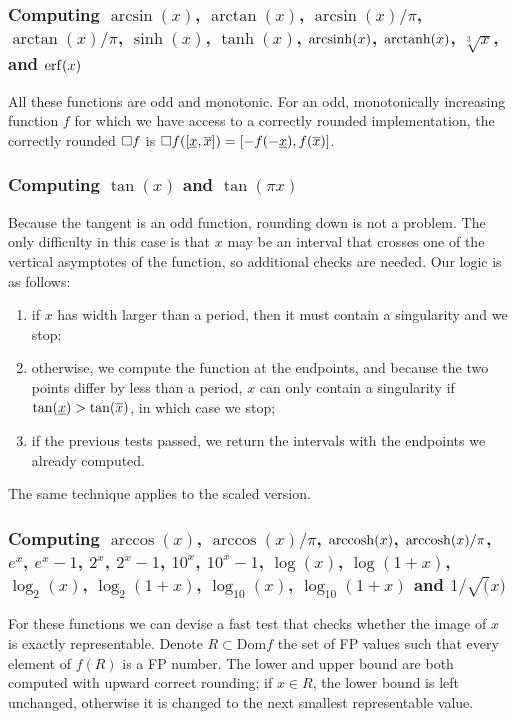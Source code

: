 \subsubsection{Computing $\arcsin(x)$, $\arctan(x)$, $\arcsin(x)/\pi$, $\arctan(x)/\pi$, $\sinh(x)$, $\tanh(x)$, $\operatorname{arcsinh}(x)$, $\operatorname{arctanh}(x)$, $\sqrt[3]{x}$, and $\operatorname{erf}(x)$}
All these functions are odd and monotonic.
For an odd, monotonically increasing function $f$ for which we have access to a correctly rounded implementation, the correctly rounded $\Box f$ is $\Box f([\underline{x}, \overline{x}]) = [-f(-\underline{x}), f(\overline{x})]$.

\subsubsection{Computing $\tan(x)$ and $\tan(\pi x)$}
Because the tangent is an odd function, rounding down is not a problem.
The only difficulty in this case is that $x$ may be an interval that crosses one of the vertical asymptotes of the function, so additional checks are needed.
Our logic is as follows:
\begin{enumerate}
	\item if $x$ has width larger than a period, then it must contain a singularity and we stop;
	\item otherwise, we compute the function at the endpoints, and because the two points differ by less than a period, $x$ can only contain a singularity if $\tan(\underline{x}) > \tan(\overline{x})$, in which case we stop;
	\item if the previous tests passed, we return the intervals with the endpoints we already computed.
\end{enumerate}
The same technique applies to the scaled version.

\subsubsection{Computing $\arccos(x)$, $\arccos(x)/\pi$, $\operatorname{arccosh}(x)$, $\operatorname{arccosh}(x)/\pi$, $e^x$, $e^x-1$, $2^x$, $2^x-1$, $10^x$, $10^x-1$, $\log(x)$, $\log(1+x)$, $\log_2(x)$, $\log_2(1+x)$, $\log_{10}(x)$, $\log_{10}(1+x)$ and $1/\sqrt(x)$}
For these functions we can devise a fast test that checks whether the image of $x$ is exactly representable.
Denote $R\subset\mathrm{Dom}f$ the set of FP values such that every element of $f(R)$ is a FP number.
The lower and upper bound are both computed with upward correct rounding; if $x\in R$, the lower bound is left unchanged, otherwise it is changed to the next smallest representable value.

